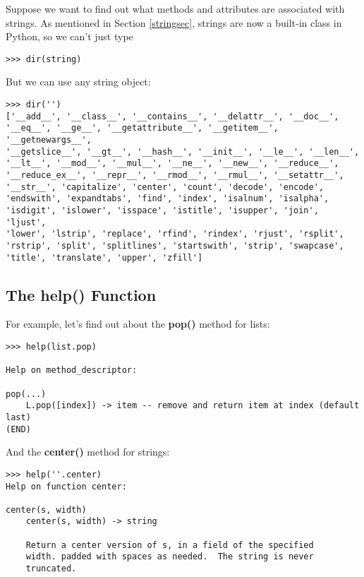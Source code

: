 Suppose we want to find out what methods and attributes are associated
with strings.  As mentioned in Section \ref{stringsec}, strings are now
a built-in class in Python, so we can't just type

\begin{Verbatim}[fontsize=\relsize{-2}]
>>> dir(string)
\end{Verbatim}

But we can use any string object:

\begin{Verbatim}[fontsize=\relsize{-2}]
>>> dir('')
['__add__', '__class__', '__contains__', '__delattr__', '__doc__',
'__eq__', '__ge__', '__getattribute__', '__getitem__', '__getnewargs__',
'__getslice__', '__gt__', '__hash__', '__init__', '__le__', '__len__',
'__lt__', '__mod__', '__mul__', '__ne__', '__new__', '__reduce__',
'__reduce_ex__', '__repr__', '__rmod__', '__rmul__', '__setattr__',
'__str__', 'capitalize', 'center', 'count', 'decode', 'encode',
'endswith', 'expandtabs', 'find', 'index', 'isalnum', 'isalpha',
'isdigit', 'islower', 'isspace', 'istitle', 'isupper', 'join', 'ljust',
'lower', 'lstrip', 'replace', 'rfind', 'rindex', 'rjust', 'rsplit',
'rstrip', 'split', 'splitlines', 'startswith', 'strip', 'swapcase',
'title', 'translate', 'upper', 'zfill']
\end{Verbatim}

\subsection{The help() Function}

For example, let's find out about the {\bf pop()} method for lists:

\begin{Verbatim}[fontsize=\relsize{-2}]
>>> help(list.pop)

Help on method_descriptor:

pop(...)
    L.pop([index]) -> item -- remove and return item at index (default
last)
(END)
\end{Verbatim}

And the {\bf center()} method for strings:

\begin{Verbatim}[fontsize=\relsize{-2}]
>>> help(''.center)
Help on function center:

center(s, width)
    center(s, width) -> string

    Return a center version of s, in a field of the specified
    width. padded with spaces as needed.  The string is never
    truncated.
\end{Verbatim}

